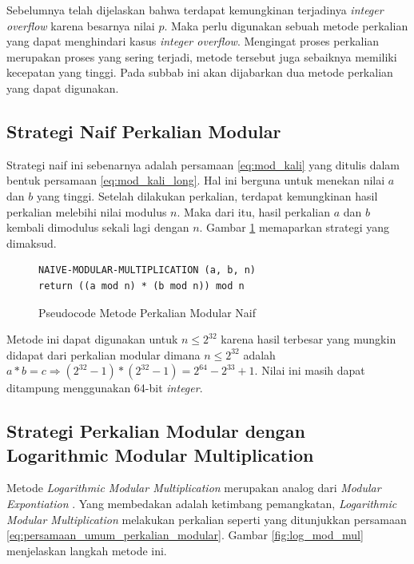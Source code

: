 Sebelumnya telah dijelaskan bahwa terdapat kemungkinan terjadinya \textit{integer overflow} karena besarnya nilai $ p $. Maka perlu digunakan sebuah metode perkalian yang dapat menghindari kasus \textit{integer overflow}. Mengingat proses perkalian merupakan proses yang sering terjadi, metode tersebut juga sebaiknya memiliki kecepatan yang tinggi. Pada subbab ini akan dijabarkan dua metode perkalian yang dapat digunakan.

\subsection{ Strategi Naif Perkalian Modular}

Strategi naif ini sebenarnya adalah persamaan \eqref{eq:mod_kali} yang ditulis dalam bentuk persamaan \eqref{eq:mod_kali_long}. Hal ini berguna untuk menekan nilai $ a $ dan $ b $ yang tinggi. Setelah dilakukan perkalian, terdapat kemungkinan hasil perkalian melebihi nilai modulus $ n $. Maka dari itu, hasil perkalian $ a $ dan $ b $ kembali dimodulus sekali lagi dengan $ n $. Gambar \ref{psdo:modmul_naive} memaparkan strategi yang dimaksud.

\begin{figure}[h!]
\begin{lstlisting}[firstnumber=0,captionpos=b]
NAIVE-MODULAR-MULTIPLICATION (a, b, n)
return ((a mod n) * (b mod n)) mod n
\end{lstlisting}
\caption{Pseudocode Metode Perkalian Modular Naif}
\label{psdo:modmul_naive}
\end{figure}

Metode ini dapat digunakan untuk $ n \leq 2^{32} $ karena hasil terbesar yang mungkin didapat dari perkalian modular dimana $ n \leq 2^{32} $ adalah $ a*b = c \Rightarrow ( 2^{32}-1 ) * ( 2^{32}-1 ) = 2^{64} - 2^{33} + 1 $. Nilai ini masih dapat ditampung menggunakan 64-bit \textit{integer}.

\subsection{ Strategi Perkalian Modular dengan Logarithmic Modular Multiplication} 
Metode \textit{Logarithmic Modular Multiplication} merupakan analog dari \textit{Modular Expontiation} \cite{geeks_modular_multiplication}. Yang membedakan adalah ketimbang pemangkatan, \textit{Logarithmic Modular Multiplication} melakukan perkalian seperti yang ditunjukkan persamaan \eqref{eq:persamaan_umum_perkalian_modular}. Gambar \ref{fig:log_mod_mul} menjelaskan langkah metode ini.

